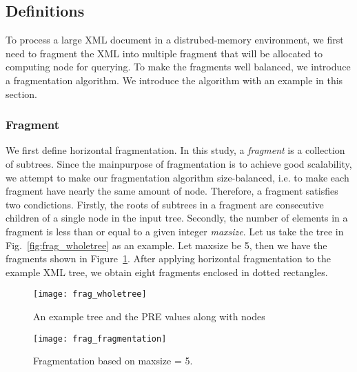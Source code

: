 \subsection{Definitions}

To process a large XML document in a distrubed-memory environment, 
we first need to fragment the XML into multiple fragment that will
be allocated to computing node for querying. To make the fragments
well balanced, we introduce a fragmentation algorithm. We introduce 
the algorithm with an example in this section.

\subsubsection{Fragment}
We first define horizontal fragmentation. In this study, a \emph{fragment} 
is a collection of subtrees.
Since the mainpurpose of fragmentation is to achieve good scalability, we
attempt to make our fragmentation algorithm size-balanced, i.e. to make each
fragment have nearly the same amount of node. 
Therefore, a fragment satisfies two condictions. Firstly,
the roots of subtrees in a fragment are consecutive children of a single 
node in the input tree. Secondly, the number of elements in a fragment is 
less than or equal to a given integer \emph{maxsize}. 
Let us take the tree in Fig.~\ref{fig:frag_wholetree} as an example. Let 
maxsize be 5, then we have the fragments shown in Figure~\ref{fig:frag_fragmentation}.
After applying horizontal fragmentation to the example XML tree,
we obtain eight fragments enclosed in dotted rectangles.


\begin{figure}[t] 
	\centering
	\texttt{[image: frag\_wholetree]}
	\caption{An example tree and the PRE values along with nodes}
	\label{fig:frag_wholetree}
	
	\texttt{[image: frag\_fragmentation]}
	\caption{Fragmentation based on maxsize = 5.}
	\label{fig:frag_fragmentation}	
\end{figure}



